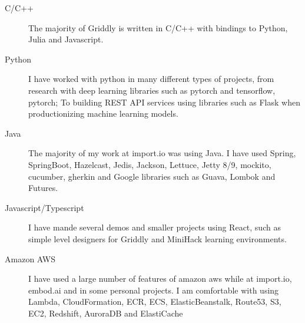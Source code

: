 \documentclass[a4paper]{article}
\def\tightlist{}
\begin{document}
\begin{description}
\tightlist
\item[C/C++]
The majority of Griddly is written in C/C++ with bindings to Python, Julia and Javascript. 
\item[Python]
I have worked with python in many different types of projects, from
research with deep learning libraries such as pytorch and tensorflow, pytorch; To building REST API services using
libraries such as Flask when productionizing machine learning models.
\item[Java]
The majority of my work at import.io was using Java. I have used Spring, SpringBoot,
Hazelcast, Jedis, Jackson, Lettuce, Jetty 8/9, mockito, cucumber,
gherkin and Google libraries such as Guava, Lombok and Futures.
\item[Javascript/Typescript]
I have mande several demos and smaller projects using React, such as simple level designers for Griddly and MiniHack learning environments.
\item[Amazon AWS]
I have used a large number of features of amazon aws while at import.io,
embod.ai and in some personal projects. I am comfortable with using
Lambda, CloudFormation, ECR, ECS, ElasticBeanstalk, Route53, S3, EC2,
Redshift, AuroraDB and ElastiCache
\end{description}
\end{document}
